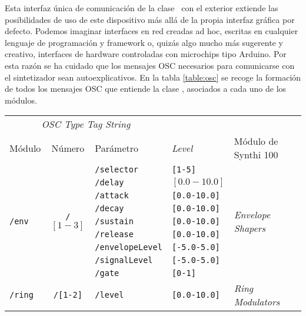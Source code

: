 Esta interfaz única de comunicación de la clase \className\ con el exterior extiende las posibilidades de uso de este dispositivo más allá de la propia interfaz gráfica por defecto. Podemos imaginar interfaces en red creadas ad hoc, escritas en cualquier lenguaje de programación y framework o, quizás algo mucho más sugerente y creativo, interfaces de hardware controladas con microchips tipo Arduino. Por esta razón se ha cuidado que los mensajes OSC necesarios para comunicarse con el sintetizador sean autoexplicativos. En la tabla \ref{table:osc} se recoge la formación de todos los mensajes OSC que entiende la clase \texttt{\className}, asociados a cada uno de los módulos.

\begin{table}
	\begin{center}
		\begin{tabular}{ l c l l l }
			\multicolumn{3}{c}{\textit{OSC Type Tag String}} \\
			\cline{1-3}
			Módulo			& Número			& Parámetro				& \textit{Level} 	& Módulo de Synthi 100 \\
			
			\hline 
			\multirow{9}{*}{\texttt{/env}}	& \multirow{9}{*}{\texttt{/$[1-3]$}}
			& \texttt{/selector}	&\texttt{[1-5]} & \multirow{9}{*}{\textit{Envelope Shapers}}\\
			& & \texttt{/delay} & $[0.0-10.0]$ & \\
			& & \texttt{/attack} & \texttt{[0.0-10.0]} & \\
			& & \texttt{/decay} & \texttt{[0.0-10.0]} &\\
			& & \texttt{/sustain} & \texttt{[0.0-10.0]}  &\\
			& & \texttt{/release} & \texttt{[0.0-10.0]} &\\
			& & \texttt{/envelopeLevel} & \texttt{[-5.0-5.0]} &\\
			& & \texttt{/signalLevel} & \texttt{[-5.0-5.0]} &\\
			& & \texttt{/gate} & \texttt{[0-1]} &\\
			\hline
			
			\multirow{1}{*}{\texttt{/ring}}	& \multirow{1}{*}{\texttt{/[1-2]}}	& \texttt{/level}	&\texttt{[0.0-10.0]} & \multirow{1}{*}{\textit{Ring Modulators}}\\
			\hline
			

\end{tabular}
\end{center}
\end{table}
